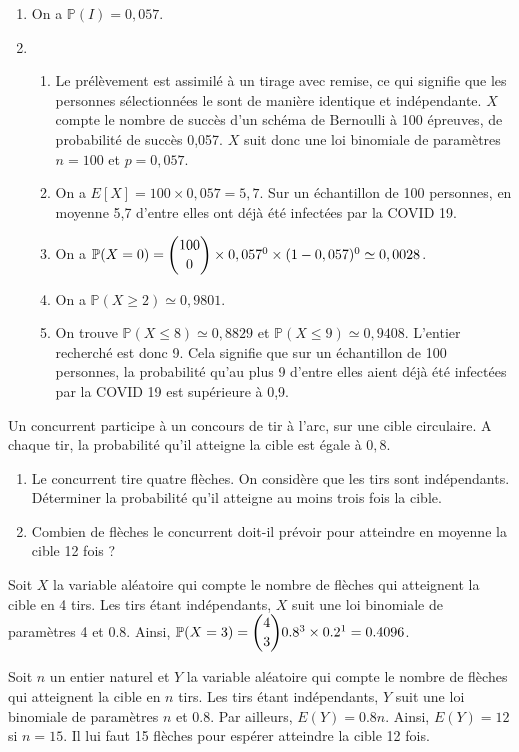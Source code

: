 \documentclass[11pt,fleqn, openany]{book} %
\begin{document}
\begin{solution}\hspace{0pt}
\begin{enumerate}
\item On a $\mathbb{P}(I)=0,057$.
\item \begin{enumerate}
\item Le prélèvement est assimilé à un tirage avec remise, ce qui signifie que les personnes sélectionnées le sont de manière identique et indépendante. $X$ compte le nombre de succès d'un schéma de Bernoulli à 100 épreuves, de probabilité de succès 0,057. $X$ suit donc une loi binomiale de paramètres $n=100$ et $p=0,057$.
\item On a $E[X]=100 \times 0,057=5,7$. Sur un échantillon de 100 personnes, en moyenne 5,7 d'entre elles ont déjà été infectées par la COVID 19.
\item On a $\mathbb{P}(X=0)=\dbinom{100}{0} \times 0,057^0 \times (1-0,057)^0 \simeq 0,0028$.
\item On a $\mathbb{P}(X \geqslant 2) \simeq 0,9801$.
\item On trouve $\mathbb{P}(X \leqslant 8) \simeq 0,8829$ et $\mathbb{P}(X \leqslant 9) \simeq 0,9408$. L'entier recherché est donc 9. Cela signifie que sur un échantillon de 100 personnes, la probabilité qu'au plus 9 d'entre elles aient déjà été infectées par la COVID 19 est supérieure à 0,9.
\end{enumerate}
\end{enumerate}

\end{solution}


\begin{exercise}[subtitle={(Asie 2015)}]
Un concurrent participe à un concours de tir à l'arc, sur une cible circulaire. A chaque tir, la probabilité qu'il atteigne la cible est égale à $0,8$.
\begin{enumerate}
\item Le concurrent tire quatre flèches. On considère que les tirs sont indépendants. Déterminer la probabilité qu'il atteigne au moins trois fois la cible.
\item Combien de flèches le concurrent doit-il prévoir pour atteindre en moyenne la cible 12 fois ?
\end{enumerate} 
 \end{exercise}
 
 \begin{solution}
Soit $X$ la variable aléatoire qui compte le nombre de flèches qui atteignent la cible en 4 tirs. Les tirs étant indépendants, $X$ suit une loi binomiale de paramètres 4 et 0.8. Ainsi, $\mathbb{P}(X=3)=\dbinom{4}{3}0.8^3 \times 0.2^1 = 0.4096$.

Soit $n$ un entier naturel et $Y$ la variable aléatoire qui compte le nombre de flèches qui atteignent la cible en $n$ tirs. Les tirs étant indépendants, $Y$ suit une loi binomiale de paramètres $n$ et 0.8. Par ailleurs, $E(Y)=0.8n$. Ainsi, $E(Y)=12$ si $n=15$. Il lui faut 15 flèches pour espérer atteindre la cible 12 fois.
\end{solution}
\end{document}
